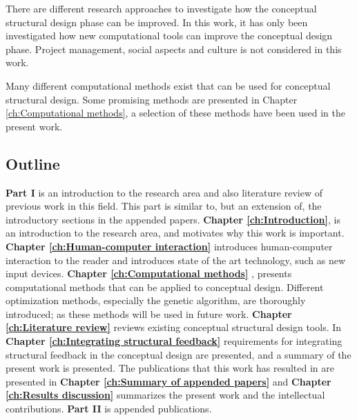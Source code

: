 There are different research approaches to investigate how the conceptual structural design phase can be improved. In this work, it has only been investigated how new computational tools can improve the conceptual design phase. Project management, social aspects and culture is not considered in this work.

Many different computational methods exist that can be used for conceptual structural design. Some promising methods are presented in Chapter \ref{ch:Computational methods}, a selection of these methods have been used in the present work.

\subsection{Outline}
\textbf{Part I} is an introduction to the research area and also literature review of previous work in this field. This part is similar to, but an extension of, the introductory sections in the appended papers. \textbf{Chapter \ref{ch:Introduction}}, is an introduction to the research area, and motivates why this work is important. \textbf{Chapter \ref{ch:Human-computer interaction}} introduces human-computer interaction to the reader and introduces state of the art technology, such as new input devices. \textbf{Chapter \ref{ch:Computational methods}} , presents computational methods that can be applied to conceptual design. Different optimization methods, especially the genetic algorithm, are thoroughly introduced; as these methods will be used in future work. \textbf{Chapter \ref{ch:Literature review}} reviews existing conceptual structural design tools. In \textbf{Chapter \ref{ch:Integrating structural feedback}} requirements for integrating structural feedback in the conceptual design are presented, and a summary of the present work is presented. The publications that this work has resulted in are presented in \textbf{Chapter \ref{ch:Summary of appended papers}} and \textbf{Chapter \ref{ch:Results discussion}} summarizes the present work and the intellectual contributions. \textbf{Part II}  is appended publications.
